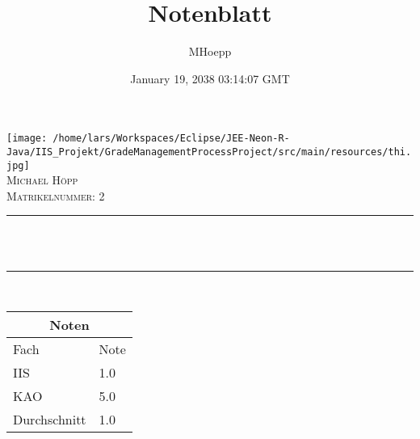 \documentclass[12pt]{article}
\title{Notenblatt}
\author{MHoepp}
\date{January 19, 2038 03:14:07 GMT}
\makeatletter
\let\thetitle\@title
\makeatother
\begin{document}
   
   
    \begin{titlepage}
        \centering
        \texttt{[image: /home/lars/Workspaces/Eclipse/JEE-Neon-R-Java/IIS\_Projekt/GradeManagementProcessProject/src/main/resources/thi.jpg]}\\[0.5 cm] 
        \textsc{\Large Michael Höpp}\\[1.0 cm] %
        \textsc{Matrikelnummer: 2}\\[0.25 cm]               %
        \rule{\linewidth}{0.2 mm} \\[0.2 cm]
        { \huge \bfseries \thetitle}\\
        \rule{\linewidth}{0.2 mm} \\[0.75 cm]
       
       
       
        \setlength{\arrayrulewidth}{1mm}
        \setlength{\tabcolsep}{12pt}
        \renewcommand{\arraystretch}{2.5}
        {
            \begin{tabular}{ |p{5cm}|p{1.5cm}|  }
                \hline
                \multicolumn{2}{|c|}{Noten} \\
                \hline
                Fach& Note  \\
                \hline
IIS & 1.0\\

KAO & 5.0\\


               
               
               
                \hline
                Durchschnitt & 1.0  \\
                \hline
            \end{tabular}
        }
       
       
       
       
       
       
       
    \end{titlepage}
   
   
   
\end{document}
